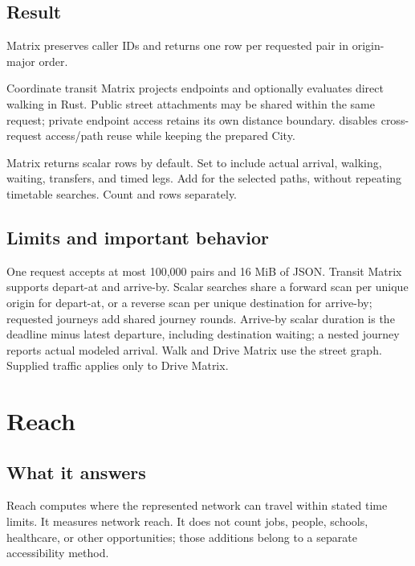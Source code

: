 \documentclass[10pt,letterpaper]{article}
\begin{document}
\subsection{Result}

Matrix preserves caller IDs and returns one row per requested pair in origin-major order.

Coordinate transit Matrix projects endpoints and optionally evaluates direct walking in Rust. Public street attachments may be shared within the same request; private endpoint access retains its own distance boundary.  disables cross-request access/path reuse while keeping the prepared City.

Matrix returns scalar rows by default. Set  to include actual arrival, walking, waiting, transfers, and timed legs. Add  for the selected paths, without repeating timetable searches. Count  and  rows separately.

\subsection{Limits and important behavior}

One request accepts at most 100,000 pairs and 16 MiB of JSON. Transit Matrix supports depart-at and arrive-by. Scalar searches share a forward scan per unique origin for depart-at, or a reverse scan per unique destination for arrive-by; requested journeys add shared journey rounds. Arrive-by scalar duration is the deadline minus latest departure, including destination waiting; a nested journey reports actual modeled arrival. Walk and Drive Matrix use the street graph. Supplied traffic applies only to Drive Matrix.

\section{Reach}

\subsection{What it answers}

Reach computes where the represented network can travel within stated time limits. It measures network reach. It does not count jobs, people, schools, healthcare, or other opportunities; those additions belong to a separate accessibility method.
\end{document}
